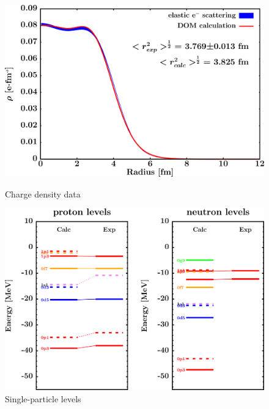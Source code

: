 \begin{figure}[H]
    \centering
    \begin{minipage}{0.45\textwidth}
        \centering
        \includegraphics[width=1.0\textwidth]{figures/ni58_chargeDensity.png}
        \caption{Charge density data}
        \label{DOMFitData_ni58_chargeDensity}
    \end{minipage}\hfill
    \begin{minipage}{0.45\textwidth}
        \centering
        \includegraphics[width=1.0\textwidth]{figures/ni58_SPLevels.png}
        \caption{Single-particle levels}
        \label{DOMFitData_ni58_SPLevels}
    \end{minipage}
\end{figure}

\afterpage{\clearpage}

